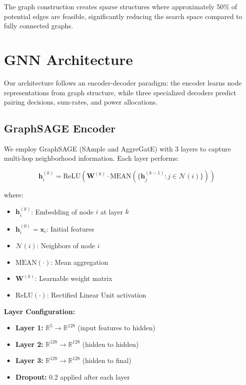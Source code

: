 The graph construction creates sparse structures where approximately 50\% of potential edges are feasible, significantly reducing the search space compared to fully connected graphs.

\section{GNN Architecture}

Our architecture follows an encoder-decoder paradigm: the encoder learns node representations from graph structure, while three specialized decoders predict pairing decisions, sum-rates, and power allocations.

\subsection{GraphSAGE Encoder}

We employ GraphSAGE (SAmple and AggreGatE) with 3 layers to capture multi-hop neighborhood information. Each layer performs:

\begin{equation}
\mathbf{h}_i^{(k)} = \text{ReLU}\left( \mathbf{W}^{(k)} \cdot \text{MEAN}\left(\{\mathbf{h}_j^{(k-1)} : j \in \mathcal{N}(i)\}\right) \right)
\end{equation}

where:
\begin{itemize}
    \item $\mathbf{h}_i^{(k)}$: Embedding of node $i$ at layer $k$
    \item $\mathbf{h}_i^{(0)} = \mathbf{x}_i$: Initial features
    \item $\mathcal{N}(i)$: Neighbors of node $i$
    \item $\text{MEAN}(\cdot)$: Mean aggregation
    \item $\mathbf{W}^{(k)}$: Learnable weight matrix
    \item $\text{ReLU}(\cdot)$: Rectified Linear Unit activation
\end{itemize}

\textbf{Layer Configuration:}
\begin{itemize}
    \item \textbf{Layer 1:} $\mathbb{R}^5 \rightarrow \mathbb{R}^{128}$ (input features to hidden)
    \item \textbf{Layer 2:} $\mathbb{R}^{128} \rightarrow \mathbb{R}^{128}$ (hidden to hidden)
    \item \textbf{Layer 3:} $\mathbb{R}^{128} \rightarrow \mathbb{R}^{128}$ (hidden to final)
    \item \textbf{Dropout:} 0.2 applied after each layer
\end{itemize}

